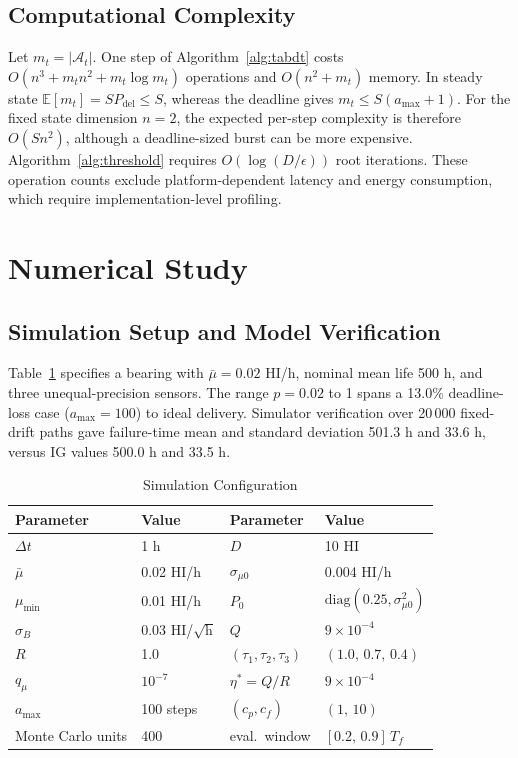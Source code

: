 \documentclass[journal]{IEEEtran}
\newcommand{\E}{\mathbb{E}}
\begin{document}
\subsection{Computational Complexity}
Let $m_t=|\mathcal A_t|$. One step of Algorithm~\ref{alg:tabdt} costs
$O(n^3+m_tn^2+m_t\log m_t)$ operations and $O(n^2+m_t)$ memory. In steady
state $\E[m_t]=SP_{\mathrm{del}}\leq S$, whereas the deadline gives
$m_t\leq S(a_{\max}+1)$. For the fixed state dimension $n=2$, the expected
per-step complexity is therefore $O(Sn^2)$, although a deadline-sized burst
can be more expensive. Algorithm~\ref{alg:threshold} requires
$O(\log(D/\epsilon))$ root iterations. These operation counts exclude
platform-dependent latency and energy consumption, which require
implementation-level profiling.

\section{Numerical Study}\label{sec:results}

\subsection{Simulation Setup and Model Verification}
Table~\ref{tab:params} specifies a bearing with $\bar\mu=0.02$ HI/h, nominal
mean life 500 h, and three unequal-precision sensors. The range $p=0.02$ to 1
spans a 13.0\% deadline-loss case ($a_{\max}=100$) to ideal delivery.
Simulator verification over 20\,000 fixed-drift paths gave failure-time mean
and standard deviation 501.3 h and 33.6 h, versus IG values 500.0 h and
33.5 h.

\begin{table}[!t]
\centering
\caption{Simulation Configuration}
\label{tab:params}
\begin{tabular}{llll}
\toprule
Parameter & Value & Parameter & Value \\
\midrule
$\Delta t$ & 1 h & $D$ & 10 HI \\
$\bar\mu$ & 0.02 HI/h & $\sigma_{\mu0}$ & 0.004 HI/h \\
$\mu_{\min}$ & 0.01 HI/h & $P_0$ & $\mathrm{diag}(0.25,\sigma_{\mu0}^2)$ \\
$\sigma_B$ & 0.03 HI/$\sqrt{\mathrm{h}}$ & $Q$ & $9\times10^{-4}$ \\
$R$ & 1.0 & $(\tau_1,\tau_2,\tau_3)$ & $(1.0,\,0.7,\,0.4)$ \\
$q_\mu$ & $10^{-7}$ & $\eta^{*}=Q/R$ & $9\times10^{-4}$ \\
$a_{\max}$ & 100 steps & $(c_p,c_f)$ & $(1,\,10)$ \\
Monte Carlo units & 400 & eval.\ window & $[0.2,\,0.9]\,T_f$ \\
\bottomrule
\end{tabular}
\end{table}
\end{document}
